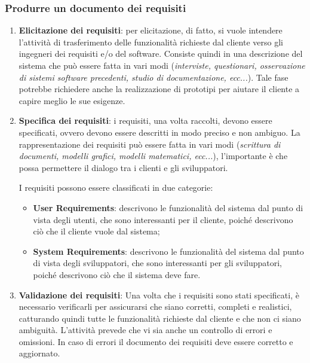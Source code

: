 \subsubsection{Produrre un documento dei requisiti}
\begin{enumerate}
    \item \textbf{Elicitazione dei requisiti}: per elicitazione, di fatto, si vuole intendere 
    l'attività di trasferimento delle funzionalità richieste dal cliente 
    verso gli ingegneri dei requisiti e/o del software. Consiste quindi in una descrizione 
    del sistema che può essere fatta in vari modi (\textit{interviste, questionari, osservazione 
    di sistemi software precedenti, studio di documentazione, ecc...}). Tale fase potrebbe 
    richiedere anche la realizzazione di prototipi per aiutare il cliente a capire meglio
    le sue esigenze.
    \item \textbf{Specifica dei requisiti}: i requisiti, una volta raccolti, devono essere
    specificati, ovvero devono essere descritti in modo preciso e non ambiguo. La rappresentazione
    dei requisiti può essere fatta in vari modi (\textit{scrittura di documenti,
    modelli grafici, modelli matematici, ecc...}), l'importante è che possa permettere
    il dialogo tra i clienti e gli sviluppatori.
    
    I requisiti possono essere classificati in due categorie:
    \begin{itemize}
        \item \textbf{User Requirements}: descrivono le funzionalità del sistema dal punto
        di vista degli utenti, che sono interessanti per il cliente, poiché descrivono
        ciò che il cliente vuole dal sistema;
        \item \textbf{System Requirements}: descrivono le funzionalità del sistema dal punto
        di vista degli sviluppatori, che sono interessanti per gli sviluppatori, poiché 
        descrivono ciò che il sistema deve fare.
    \end{itemize}
    \item \textbf{Validazione dei requisiti}: Una volta che i requisiti sono stati
    specificati, è necessario verificarli per assicurarsi che siano corretti, completi
    e realistici, 
    catturando quindi tutte le funzionalità richieste dal cliente e che non ci siano
    ambiguità. L'attività prevede che vi sia anche un controllo di errori e omissioni.
    In caso di errori il documento dei requisiti deve essere corretto e aggiornato.
\end{enumerate}
